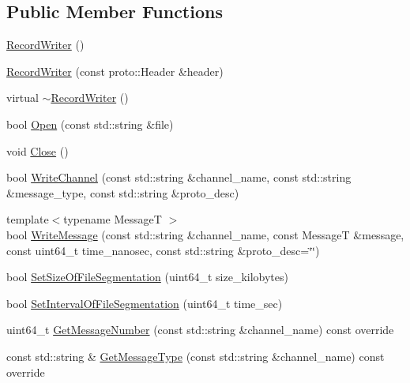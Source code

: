 \subsection*{Public Member Functions}
\begin{DoxyCompactItemize}
\item 
\hyperlink{classapollo_1_1cyber_1_1record_1_1RecordWriter_a88286f6474eee87f0790523ff870c65a}{Record\-Writer} ()
\item 
\hyperlink{classapollo_1_1cyber_1_1record_1_1RecordWriter_a53d830c597e5874a7304b13f5f15283b}{Record\-Writer} (const proto\-::\-Header \&header)
\item 
virtual \hyperlink{classapollo_1_1cyber_1_1record_1_1RecordWriter_a24af86f0bc084759c1be3a9f4676539e}{$\sim$\-Record\-Writer} ()
\item 
bool \hyperlink{classapollo_1_1cyber_1_1record_1_1RecordWriter_a659682af6dd6b22c5f470470929a0fee}{Open} (const std\-::string \&file)
\item 
void \hyperlink{classapollo_1_1cyber_1_1record_1_1RecordWriter_aeeb301a117dd331fc6fcd5d7c901edef}{Close} ()
\item 
bool \hyperlink{classapollo_1_1cyber_1_1record_1_1RecordWriter_aff50d522ad22bcfb6ecc8affe837f048}{Write\-Channel} (const std\-::string \&channel\-\_\-name, const std\-::string \&message\-\_\-type, const std\-::string \&proto\-\_\-desc)
\item 
{\footnotesize template$<$typename Message\-T $>$ }\\bool \hyperlink{classapollo_1_1cyber_1_1record_1_1RecordWriter_a9f8c8aa8c692d90fe5463930b440493e}{Write\-Message} (const std\-::string \&channel\-\_\-name, const Message\-T \&message, const uint64\-\_\-t time\-\_\-nanosec, const std\-::string \&proto\-\_\-desc=\char`\"{}\char`\"{})
\item 
bool \hyperlink{classapollo_1_1cyber_1_1record_1_1RecordWriter_a5fa79eae0201d4f3334b069b24a080b9}{Set\-Size\-Of\-File\-Segmentation} (uint64\-\_\-t size\-\_\-kilobytes)
\item 
bool \hyperlink{classapollo_1_1cyber_1_1record_1_1RecordWriter_a5e64257c68b872bc9bbb35874d9cdc40}{Set\-Interval\-Of\-File\-Segmentation} (uint64\-\_\-t time\-\_\-sec)
\item 
uint64\-\_\-t \hyperlink{classapollo_1_1cyber_1_1record_1_1RecordWriter_a2f0637a10532fd3d721ec27dec9aab05}{Get\-Message\-Number} (const std\-::string \&channel\-\_\-name) const override
\item 
const std\-::string \& \hyperlink{classapollo_1_1cyber_1_1record_1_1RecordWriter_a7bab92d44a94ea9c97546ff809c05064}{Get\-Message\-Type} (const std\-::string \&channel\-\_\-name) const override

\end{DoxyCompactItemize}
